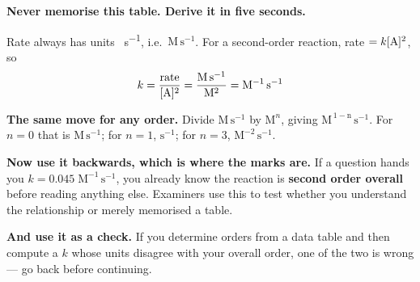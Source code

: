 \documentclass{apchem-worksheet}
\begin{document}
\begin{center}
\end{center}

\begin{workedexample}
\textbf{Never memorise this table. Derive it in five seconds.}

Rate always has units \si{\Molar\per\second}, i.e.\
$\mathrm{M\,s^{-1}}$. For a second-order reaction,
rate $= k[\ce{A}]^{2}$, so
\[ k = \frac{\text{rate}}{[\ce{A}]^{2}}
     = \frac{\mathrm{M\,s^{-1}}}{\mathrm{M^{2}}}
     = \mathrm{M^{-1}\,s^{-1}} \]

\textbf{The same move for any order.} Divide $\mathrm{M\,s^{-1}}$ by
$\mathrm{M}^{n}$, giving $\mathrm{M^{\,1-n}\,s^{-1}}$. For $n=0$ that is
$\mathrm{M\,s^{-1}}$; for $n=1$, $\mathrm{s^{-1}}$; for $n=3$,
$\mathrm{M^{-2}\,s^{-1}}$.

\textbf{Now use it backwards, which is where the marks are.} If a
question hands you $k = 0.045\;\mathrm{M^{-1}\,s^{-1}}$, you already
know the reaction is \textbf{second order overall} before reading
anything else. Examiners use this to test whether you understand the
relationship or merely memorised a table.

\textbf{And use it as a check.} If you determine orders from a data
table and then compute a $k$ whose units disagree with your overall
order, one of the two is wrong --- go back before continuing.
\end{workedexample}
\end{document}
